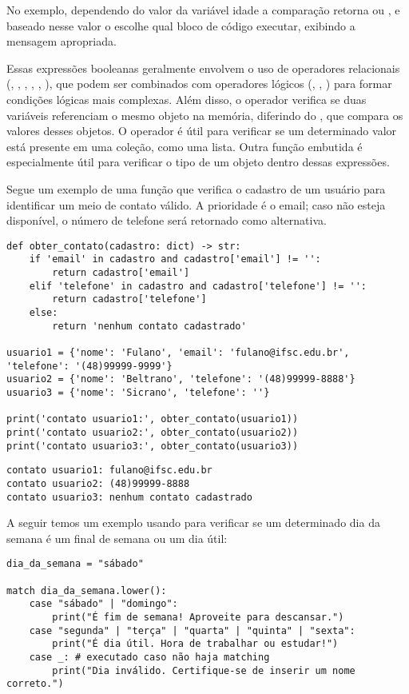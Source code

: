 No exemplo, dependendo do valor da variável idade a comparação  retorna  ou
, e baseado nesse valor o  escolhe qual bloco de código executar, exibindo a mensagem apropriada.

Essas expressões booleanas geralmente envolvem o uso de operadores relacionais
(\inlcode{==}, \inlcode{!=}, \inlcode{>}, \inlcode{<}, \inlcode{>=}, \inlcode{<=}), que podem ser combinados com
operadores lógicos (, , ) para formar condições lógicas mais complexas.
Além disso, o operador  verifica se duas variáveis referenciam o mesmo objeto na memória, diferindo
do \inlcode{==}, que compara os valores desses objetos.
O operador  é útil para verificar se um determinado valor está presente em uma coleção, como uma lista.
Outra função embutida  é especialmente útil para verificar o tipo de um objeto
dentro dessas expressões.

Segue um exemplo de uma função que verifica o cadastro de um usuário para identificar um meio de contato válido.
A prioridade é o email; caso não esteja disponível, o número de telefone será retornado como alternativa.
\begin{verbatim}
def obter_contato(cadastro: dict) -> str:
    if 'email' in cadastro and cadastro['email'] != '':
        return cadastro['email']
    elif 'telefone' in cadastro and cadastro['telefone'] != '':
        return cadastro['telefone']
    else:
        return 'nenhum contato cadastrado'

usuario1 = {'nome': 'Fulano', 'email': 'fulano@ifsc.edu.br', 'telefone': '(48)99999-9999'}
usuario2 = {'nome': 'Beltrano', 'telefone': '(48)99999-8888'}
usuario3 = {'nome': 'Sicrano', 'telefone': ''}

print('contato usuario1:', obter_contato(usuario1))
print('contato usuario2:', obter_contato(usuario2))
print('contato usuario3:', obter_contato(usuario3))
\end{verbatim}
\begin{verbatim}
contato usuario1: fulano@ifsc.edu.br
contato usuario2: (48)99999-8888
contato usuario3: nenhum contato cadastrado
\end{verbatim}

A seguir temos um exemplo usando  para verificar se um determinado dia da semana é um final de
semana ou um dia útil:
\begin{verbatim}
dia_da_semana = "sábado"

match dia_da_semana.lower():
    case "sábado" | "domingo":
        print("É fim de semana! Aproveite para descansar.")
    case "segunda" | "terça" | "quarta" | "quinta" | "sexta":
        print("É dia útil. Hora de trabalhar ou estudar!")
    case _: # executado caso não haja matching
        print("Dia inválido. Certifique-se de inserir um nome correto.")
\end{verbatim}

